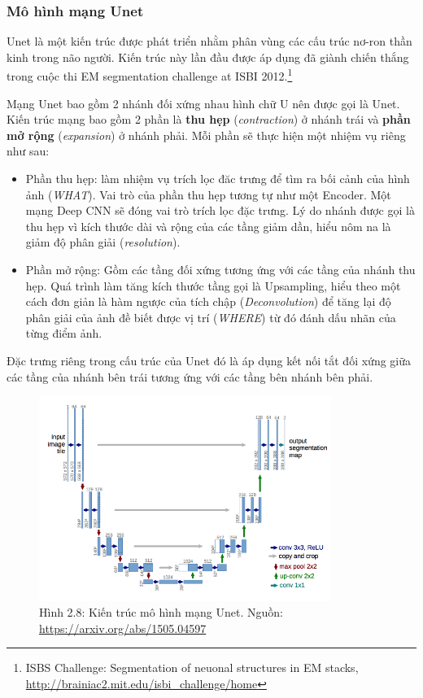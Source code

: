 \documentclass[a4paper]{article}
\begin{document}
\subsubsection{Mô hình mạng Unet}
Unet là một kiến trúc được phát triển nhằm phân vùng các cấu trúc nơ-ron thần kinh trong não người. Kiến trúc này lần đầu được áp dụng đã giành chiến thắng trong cuộc thi EM segmentation challenge at ISBI 2012.\footnote{ISBS Challenge: Segmentation of neuonal structures in EM stacks, \href{http://brainiac2.mit.edu/isbi\_challenge/home}{http://brainiac2.mit.edu/isbi\_challenge/home}}

\noindent
Mạng Unet bao gồm 2 nhánh đối xứng nhau hình chữ U nên được gọi là Unet. Kiến trúc mạng bao gồm 2 phần là \textbf{thu hẹp} (\textit{contraction}) ở nhánh trái và \textbf{phần mở rộng} (\textit{expansion}) ở nhánh phải. Mỗi phần sẽ thực hiện một nhiệm vụ riêng như sau:

\begin{itemize}
    \item Phần thu hẹp: làm nhiệm vụ trích lọc đăc trưng để tìm ra bối cảnh của hình ảnh (\textit{WHAT}). Vai trò của phần thu hẹp tương tự như một Encoder. Một mạng Deep CNN sẽ đóng vai trò trích lọc đặc trưng. Lý do nhánh được gọi là thu hẹp vì kích thước dài và rộng của các tầng giảm dần, hiểu nôm na là giảm độ phân giải (\textit{resolution}).
    
    \item Phần mở rộng: Gồm các tầng đối xứng tương ứng với các tầng của nhánh thu hẹp. Quá trình làm tăng kích thước tầng gọi là Upsampling, hiểu theo một cách đơn giản là hàm ngược của tích chập (\textit{Deconvolution}) để tăng lại độ phân giải của ảnh đề biết được vị trí (\textit{WHERE}) từ đó đánh dấu nhãn của từng điểm ảnh.
\end{itemize}

\noindent
Đặc trưng riêng trong cấu trúc của Unet đó là áp dụng kết nối tắt đối xứng giữa các tầng của nhánh bên trái tương ứng với các tầng bên nhánh bên phải.
\begin{figure}[h!]
\centering
\includegraphics[width=9.5cm]{images/2_8.png}
\caption{Hình 2.8: Kiến trúc mô hình mạng Unet. Nguồn: \href{https://arxiv.org/abs/1505.04597}{https://arxiv.org/abs/1505.04597}}
\end{figure}
\end{document}
